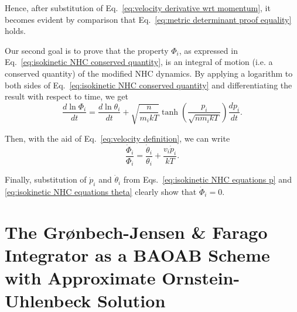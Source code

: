 \documentclass[
aip,
jcp,
reprint,
]{revtex4-1}
\begin{document}
Hence, after substitution of Eq.~\eqref{eq:velocity derivative wrt momentum}, it becomes evident by comparison that Eq.~\eqref{eq:metric determinant proof equality} holds.

Our second goal is to prove that the property $\Phi_i$, as expressed in Eq.~\eqref{eq:isokinetic NHC conserved quantity}, is an integral of motion (i.e. a conserved quantity) of the modified NHC dynamics.
By applying a logarithm to both sides of Eq.~\eqref{eq:isokinetic NHC conserved quantity} and differentiating the result with respect to time, we get
%
\begin{equation}
\frac{d \ln \Phi_i}{dt} = \frac{d \ln \theta_i}{dt} + \sqrt{\frac{n}{m_i kT}}  \tanh\left(\frac{p_i}{\sqrt{n m_i k T}}\right) \frac{d p_i}{dt}.
\end{equation}

Then, with the aid of Eq.~\eqref{eq:velocity definition}, we can write
\begin{equation}
\frac{\dot{\Phi}_i}{\Phi_i} = \frac{\dot{\theta}_i}{\theta_i} + \frac{v_i \dot{p}_i}{kT}.
\end{equation}

Finally, substitution of $ \dot{p}_i$ and $\dot{\theta}_i$ from Eqs.~\eqref{eq:isokinetic NHC equations p} and \eqref{eq:isokinetic NHC equations theta} clearly show that $\dot{\Phi}_i = 0$.

\section{The Gr{\o}nbech-Jensen \& Farago Integrator as a BAOAB Scheme with Approximate Ornstein-Uhlenbeck Solution}
\end{document}
